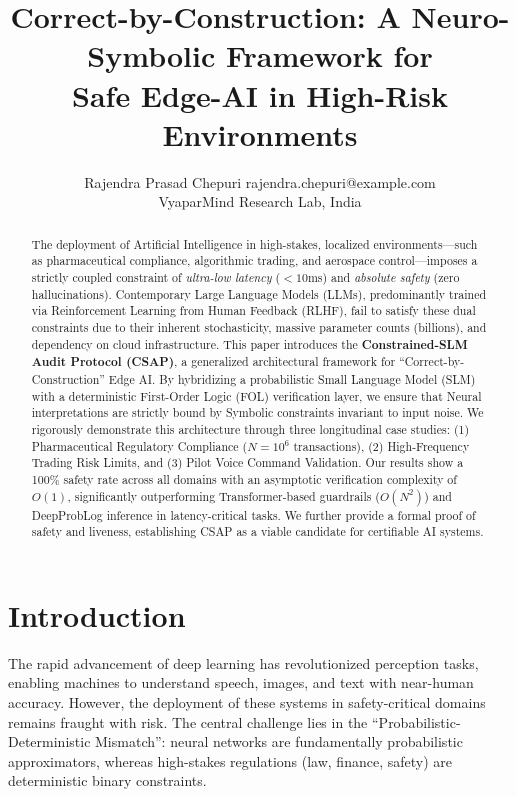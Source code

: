\documentclass[11pt]{article}
\title{Correct-by-Construction: A Neuro-Symbolic Framework for \\ Safe Edge-AI in High-Risk Environments}
\author{\name Rajendra Prasad Chepuri \email rajendra.chepuri@example.com \\
       \addr VyaparMind Research Lab, India}
\begin{document}
\maketitle

\begin{abstract}
The deployment of Artificial Intelligence in high-stakes, localized environments---such as pharmaceutical compliance, algorithmic trading, and aerospace control---imposes a strictly coupled constraint of \textit{ultra-low latency} ($<10$ms) and \textit{absolute safety} (zero hallucinations). Contemporary Large Language Models (LLMs), predominantly trained via Reinforcement Learning from Human Feedback (RLHF), fail to satisfy these dual constraints due to their inherent stochasticity, massive parameter counts (billions), and dependency on cloud infrastructure. This paper introduces the \textbf{Constrained-SLM Audit Protocol (CSAP)}, a generalized architectural framework for ``Correct-by-Construction'' Edge AI. By hybridizing a probabilistic Small Language Model (SLM) with a deterministic First-Order Logic (FOL) verification layer, we ensure that Neural interpretations are strictly bound by Symbolic constraints invariant to input noise. We rigorously demonstrate this architecture through three longitudinal case studies: (1) Pharmaceutical Regulatory Compliance ($N=10^6$ transactions), (2) High-Frequency Trading Risk Limits, and (3) Pilot Voice Command Validation. Our results show a 100\% safety rate across all domains with an asymptotic verification complexity of $O(1)$, significantly outperforming Transformer-based guardrails ($O(N^2)$) and DeepProbLog inference in latency-critical tasks. We further provide a formal proof of safety and liveness, establishing CSAP as a viable candidate for certifiable AI systems.
\end{abstract}

\section{Introduction}

The rapid advancement of deep learning has revolutionized perception tasks, enabling machines to understand speech, images, and text with near-human accuracy. However, the deployment of these systems in safety-critical domains remains fraught with risk. The central challenge lies in the ``Probabilistic-Deterministic Mismatch'': neural networks are fundamentally probabilistic approximators, whereas high-stakes regulations (law, finance, safety) are deterministic binary constraints.
\end{document}
